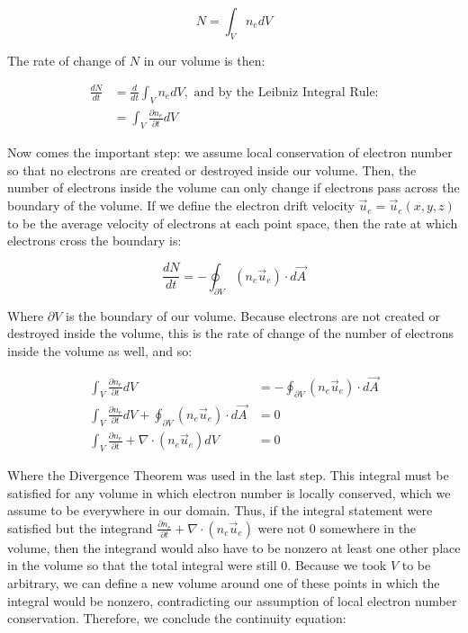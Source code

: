 \documentclass[11pt]{article}
\begin{document}
\begin{equation}
    N = \int_{V} n_e dV
\end{equation}

The rate of change of $N$ in our volume is then:

\begin{align}
    \frac{dN}{dt} & = \frac{d}{dt}\int_{V}n_e dV, \text{ and by the Leibniz Integral Rule:} \\
    & = \int_{V}\frac{\partial{n_e}}{\partial{t}}dV
\end{align}

Now comes the important step: we assume local conservation of electron number so that no electrons are created or destroyed inside our volume. Then, the number of electrons inside the volume can only change if electrons pass across the boundary of the volume. If we define the electron drift velocity $\vec{u}_e=\vec{u}_e(x,y,z)$ to be the average velocity of electrons at each point space, then the rate at which electrons cross the boundary is:

\begin{equation}
    \frac{dN}{dt} = -\oint_{\partial V}{(n_e\vec{u}_e)\cdot d\vec{A}}
\end{equation}

Where $\partial V$ is the boundary of our volume. Because electrons are not created or destroyed inside the volume, this is the rate of change of the number of electrons inside the volume as well, and so:

\begin{align}
    \int_V{\frac{\partial n_e}{\partial t}}dV &= -\oint_{\partial V} (n_e\vec{u}_e)\cdot d\vec{A} \\
    \int_V{\frac{\partial n_e}{\partial t}}dV + \oint_{\partial V} (n_e\vec{u}_e)\cdot d\vec{A} &= 0 \\
    \int_V{\frac{\partial n_e}{\partial t} + \nabla \cdot (n_e \vec{u}_e) dV} & = 0
\end{align}

Where the Divergence Theorem was used in the last step. This integral must be satisfied for any volume in which electron number is locally conserved, which we assume to be everywhere in our domain. Thus, if the integral statement were satisfied but the integrand $\frac{\partial{n_e}}{\partial t} + \nabla \cdot (n_e \vec{u}_e)$ were not $0$ somewhere in the volume, then the integrand would also have to be nonzero at least one other place in the volume so that the total integral were still $0$. Because we took $V$ to be arbitrary, we can define a new volume around one of these points in which the integral would be nonzero, contradicting our assumption of local electron number conservation. Therefore, we conclude the continuity equation:
\end{document}
